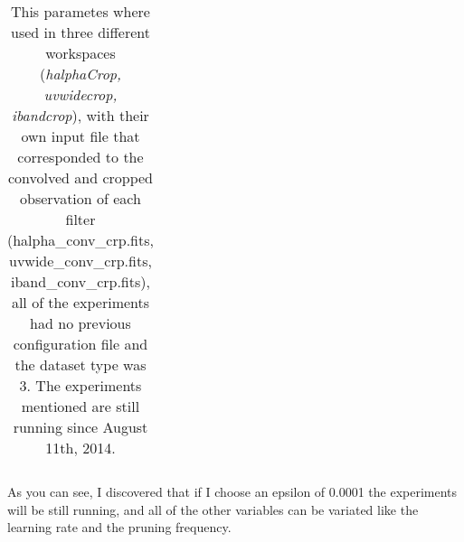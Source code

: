 \documentclass[11pt,fleqn]{book} %
\begin{document}
\begin{table}[h!]
\begin{tabular}{ c c c c c c }
																																																																																																																																																																																																																																																																										          \hline
																																																																																																																																																																																																																																																																											    \end{tabular}
																																																																																																																																																																																																																																																																											      \caption{This parametes where used in three different workspaces (\emph{halphaCrop, uvwidecrop, ibandcrop}), with their own input file that corresponded to the convolved and cropped observation of each filter (halpha\_conv\_crp.fits, uvwide\_conv\_crp.fits, iband\_conv\_crp.fits), all of the experiments had no previous configuration file and the dataset type was 3. The experiments mentioned are still running since August 11th, 2014.}
																																																																																																																																																																																																																																																																											        \label{tab:threerun}
																																																																																																																																																																																																																																																																												\end{table}

																																																																																																																																																																																																																																																																												As you can see, I discovered that if I choose an epsilon of 0.0001 the experiments will be still running, and all of the other variables can be variated like the learning rate and the pruning frequency.
\end{document}
